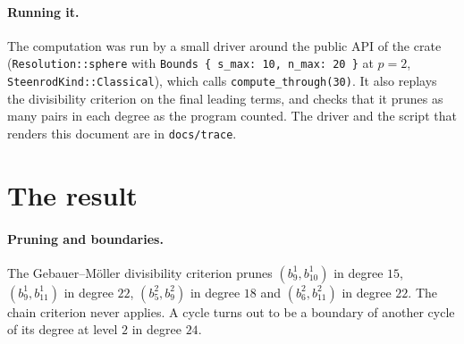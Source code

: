 \documentclass[11pt]{article}
\begin{document}
\paragraph{Running it.}\sloppy
The computation was run by a small driver around the public API of the crate (\texttt{Resolution::sphere} with \texttt{Bounds \{ s\_max: 10, n\_max: 20 \}} at $p = 2$, \texttt{SteenrodKind::Classical}), which calls \texttt{compute\_through(30)}. It also replays the divisibility criterion on the final leading terms, and checks that it prunes as many pairs in each degree as the program counted. The driver and the script that renders this document are in \texttt{docs/trace}.



\section{The result}

\paragraph{Pruning and boundaries.} The Gebauer--M\"oller divisibility criterion prunes $(b^{1}_{9}, b^{1}_{10})$ in degree $15$, $(b^{1}_{9}, b^{1}_{11})$ in degree $22$, $(b^{2}_{5}, b^{2}_{9})$ in degree $18$ and $(b^{2}_{6}, b^{2}_{11})$ in degree $22$. The chain criterion never applies. A cycle turns out to be a boundary of another cycle of its degree at level $2$ in degree $24$.
\end{document}
